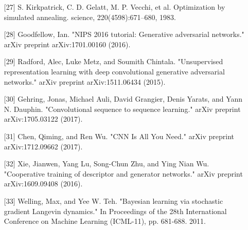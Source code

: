 \begin{itemize}
	\item [{[}27{]}] S. Kirkpatrick, C. D. Gelatt, M. P. Vecchi, et al. Optimization by simulated annealing. science, 220(4598):671–680, 1983.
	\item [{[}28{]}] Goodfellow, Ian. "NIPS 2016 tutorial: Generative adversarial networks." arXiv preprint arXiv:1701.00160 (2016).
	\item [{[}29{]}] Radford, Alec, Luke Metz, and Soumith Chintala. "Unsupervised representation learning with deep convolutional generative adversarial networks." arXiv preprint arXiv:1511.06434 (2015).
	\item [{[}30{]}] Gehring, Jonas, Michael Auli, David Grangier, Denis Yarats, and Yann N. Dauphin. "Convolutional sequence to sequence learning." arXiv preprint arXiv:1705.03122 (2017).
	\item [{[}31{]}] Chen, Qiming, and Ren Wu. "CNN Is All You Need." arXiv preprint arXiv:1712.09662 (2017).
	\item [{[}32{]}] Xie, Jianwen, Yang Lu, Song-Chun Zhu, and Ying Nian Wu. "Cooperative training of descriptor and generator networks." arXiv preprint arXiv:1609.09408 (2016).
	\item [{[}33{]}] Welling, Max, and Yee W. Teh. "Bayesian learning via stochastic gradient Langevin dynamics." In Proceedings of the 28th International Conference on Machine Learning (ICML-11), pp. 681-688. 2011.
\end{itemize}

